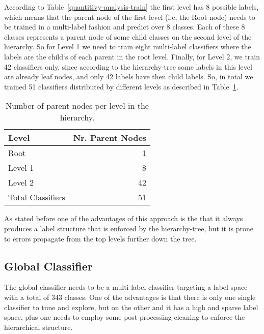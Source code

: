 \documentclass[11pt,a4paper]{article}
\begin{document}
According to Table~\ref{quantitivy-analysis-train} the first level has 8 possible
labels, which means that the parent node of the first level (i.e, the Root node)
needs to be trained in a multi-label fashion and predict over 8 classes. Each of
these 8 classes represents a parent node of some child classes on the
second level of the hierarchy. So for Level 1 we need to train eight multi-label
classifiers where the labels are the child`s of each parent in the root level.
Finally, for Level 2, we train 42 classifiers only, since according to the
hierarchy-tree some labels in this level are already leaf nodes, and only 42
labels have then child labels. So, in total we trained 51 classifiers
distributed by different levels as described in Table~\ref{parent-per-node-classifiers}.

\begin{table}[!h]
\begin{center}
\begin{tabular}{|l|r|}
\hline\centering\textbf{Level}  &  \textbf{Nr. Parent Nodes}    \\
\hline
Root              &  1       \\
Level 1           &  8       \\
Level 2           &  42      \\
\hline
Total Classifiers & 51       \\
\hline
\end{tabular}
\end{center}
\caption{\label{parent-per-node-classifiers}Number of parent nodes per level in
the hierarchy.}
\end{table}

As stated before one of the advantages of this approach is the that it always
produces a label structure that is enforced by the hierarchy-tree, but it is
prone to errors propagate from the top levels further down the tree.


\subsection{Global Classifier}

The global classifier needs to be a multi-label classifier targeting a label
space with a total of 343 classes. One of the advantages is that there is only
one single classifier to tune and explore, but on the other and it has a high
and sparse label space, plus one needs to employ some post-processing cleaning
to enforce the hierarchical structure.
\end{document}
